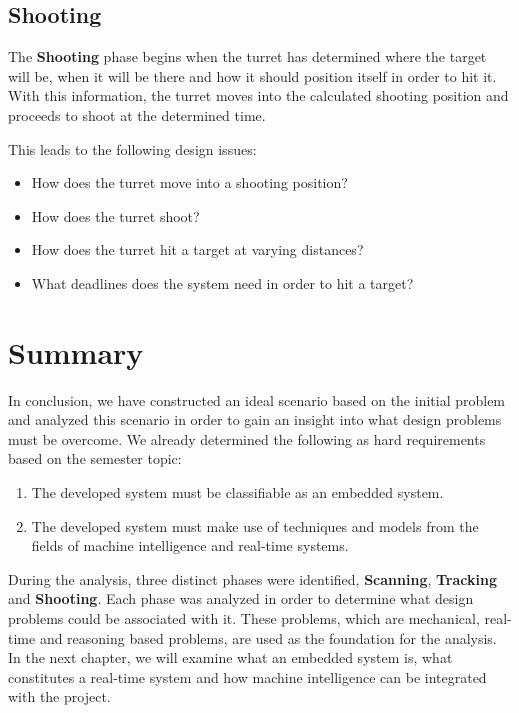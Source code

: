 \subsection{Shooting}
The \textbf{Shooting} phase begins when the turret has determined where the
target will be, when it will be there and how it should position itself in
order to hit it.
With this information, the turret moves into the calculated shooting position and
proceeds to shoot at the determined time.\nl

This leads to the following design issues:
\begin{itemize}
  \item How does the turret move into a shooting position?
  \item How does the turret shoot?
  \item How does the turret hit a target at varying distances?
  \item What deadlines does the system need in order to hit a target?
\end{itemize}

\section{Summary}
In conclusion, we have constructed an ideal scenario based on the initial
problem and analyzed this scenario in order to gain an insight into what
design problems must be overcome. We already determined the following as hard
requirements based on the semester topic:

\begin{enumerate}
	\item The developed system must be classifiable as an embedded system.
	\item The developed system must make use of techniques and models from the
	fields of machine intelligence and real-time systems.
\end{enumerate}

During the analysis, three distinct phases were identified, \textbf{Scanning},
\textbf{Tracking} and \textbf{Shooting}. Each phase was analyzed in order to
determine what design problems could be associated with it. These problems,
which are mechanical, real-time and reasoning based problems, are used as the
foundation for the analysis. In the next chapter, we will examine what an
embedded system is, what constitutes a real-time system and how machine
intelligence can be integrated with the project.
